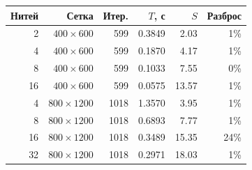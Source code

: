 \small
\begin{tabular}{rrrrrr}
\toprule
Нитей & Сетка & Итер. & $T$, с & $S$ & Разброс\\
\midrule
2 & $400\times600$ & 599 & 0.3849 & 2.03 & 1\%\\
4 & $400\times600$ & 599 & 0.1870 & 4.17 & 1\%\\
8 & $400\times600$ & 599 & 0.1033 & 7.55 & 0\%\\
16 & $400\times600$ & 599 & 0.0575 & 13.57 & 1\%\\
4 & $800\times1200$ & 1018 & 1.3570 & 3.95 & 1\%\\
8 & $800\times1200$ & 1018 & 0.6893 & 7.77 & 1\%\\
16 & $800\times1200$ & 1018 & 0.3489 & 15.35 & 24\%\\
32 & $800\times1200$ & 1018 & 0.2971 & 18.03 & 1\%\\
\bottomrule
\end{tabular}
